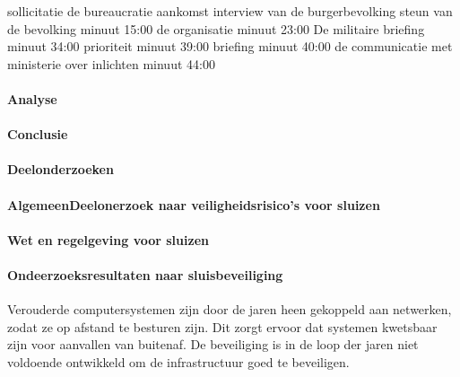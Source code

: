 \cite{ovvMortierOngevalMaliVideo} 
\cite{bnnvara13062018malirapport}
\cite{eucal11012021malimissieverlengd}
\cite{nos21052014zorgenmalimissie}
\cite{meijnders}
\cite{bnrwebredactie}
\cite{keultjes01062016malimissiecoalitie}
\cite{veenhof18012019}

\cite{isitman06012016militair}
\cite{nporadio11072016filmdemissie}
\cite{parlementairmonitor15122013mortierongeluk}
sollicitatie
de bureaucratie
aankomst
interview van de burgerbevolking
steun van de bevolking minuut 15:00
de organisatie minuut 23:00
De militaire briefing minuut 34:00
prioriteit minuut 39:00
briefing minuut 40:00
de communicatie met ministerie over inlichten minuut 44:00
\cite{DemissieFilm}
\paragraph{Analyse}
\paragraph{Conclusie}



\paragraph{Deelonderzoeken}

\paragraph{AlgemeenDeelonerzoek naar veiligheidsrisico's voor sluizen}
\paragraph{Wet en regelgeving voor sluizen}

\paragraph{Ondeerzoeksresultaten naar sluisbeveiliging}



Verouderde computersystemen zijn door de jaren heen gekoppeld aan netwerken, zodat ze op afstand te besturen zijn. Dit zorgt ervoor dat systemen kwetsbaar zijn voor aanvallen van buitenaf. De beveiliging is in de loop der jaren niet voldoende ontwikkeld om de infrastructuur goed te beveiligen.

